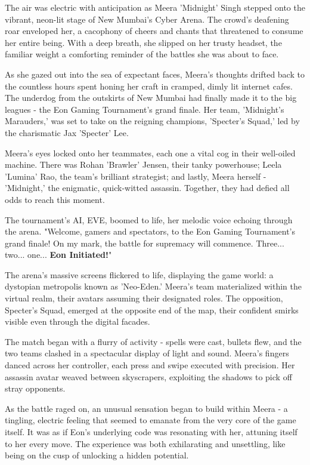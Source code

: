 \documentclass[12pt]{book}
\begin{document}
The air was electric with anticipation as Meera 'Midnight' Singh stepped
onto the vibrant, neon-lit stage of New Mumbai's Cyber Arena. The
crowd's deafening roar enveloped her, a cacophony of cheers and chants
that threatened to consume her entire being. With a deep breath, she
slipped on her trusty headset, the familiar weight a comforting reminder
of the battles she was about to face.

As she gazed out into the sea of expectant faces, Meera's thoughts
drifted back to the countless hours spent honing her craft in cramped,
dimly lit internet cafes. The underdog from the outskirts of New Mumbai
had finally made it to the big leagues - the Eon Gaming Tournament's
grand finale. Her team, 'Midnight's Marauders,' was set to take on the
reigning champions, 'Specter's Squad,' led by the charismatic Jax
'Specter' Lee.

Meera's eyes locked onto her teammates, each one a vital cog in their
well-oiled machine. There was Rohan 'Brawler' Jensen, their tanky
powerhouse; Leela 'Lumina' Rao, the team's brilliant strategist; and
lastly, Meera herself - 'Midnight,' the enigmatic, quick-witted
assassin. Together, they had defied all odds to reach this moment.

The tournament's AI, EVE, boomed to life, her melodic voice echoing
through the arena. "Welcome, gamers and spectators, to the Eon Gaming
Tournament's grand finale! On my mark, the battle for supremacy will
commence. Three... two... one... \textbf{Eon Initiated!}"

The arena's massive screens flickered to life, displaying the game
world: a dystopian metropolis known as 'Neo-Eden.' Meera's team
materialized within the virtual realm, their avatars assuming their
designated roles. The opposition, Specter's Squad, emerged at the
opposite end of the map, their confident smirks visible even through the
digital facades.

The match began with a flurry of activity - spells were cast, bullets
flew, and the two teams clashed in a spectacular display of light and
sound. Meera's fingers danced across her controller, each press and
swipe executed with precision. Her assassin avatar weaved between
skyscrapers, exploiting the shadows to pick off stray opponents.

As the battle raged on, an unusual sensation began to build within Meera
- a tingling, electric feeling that seemed to emanate from the very core
of the game itself. It was as if Eon's underlying code was resonating
with her, attuning itself to her every move. The experience was both
exhilarating and unsettling, like being on the cusp of unlocking a
hidden potential.
\end{document}

